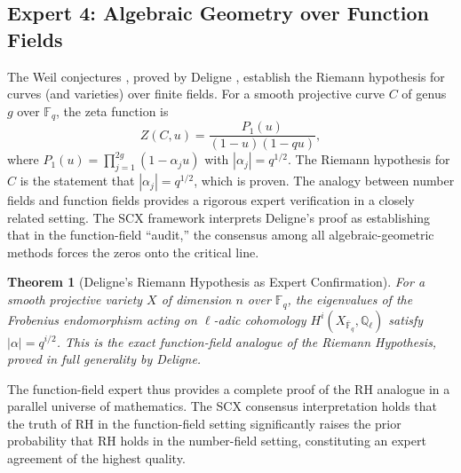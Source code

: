 \documentclass[12pt,a4paper]{article}
\newtheorem{theorem}{Theorem}[section]
\theoremstyle{remark}
\begin{document}
\subsection{Expert 4: Algebraic Geometry over Function Fields}
\label{sec:expert4}
The Weil conjectures \cite{Weil1948}, proved by Deligne \cite{Deligne1974},
establish the Riemann hypothesis for curves (and varieties) over finite
fields. For a smooth projective curve $C$ of genus $g$ over $\mathbb{F}_q$,
the zeta function is
\[
Z(C, u) = \frac{P_1(u)}{(1-u)(1-qu)},
\]
where $P_1(u) = \prod_{j=1}^{2g} (1 - \alpha_j u)$ with $|\alpha_j| = q^{1/2}$.
The Riemann hypothesis for $C$ is the statement that $|\alpha_j| = q^{1/2}$,
which is proven.
The analogy between number fields and function fields provides a rigorous
expert verification in a closely related setting. The SCX framework
interprets Deligne's proof as establishing that in the function-field
``audit,'' the consensus among all algebraic-geometric methods forces the
zeros onto the critical line.
\begin{theorem}[Deligne's Riemann Hypothesis as Expert Confirmation]
\label{thm:deligne}
For a smooth projective variety $X$ of dimension $n$ over $\mathbb{F}_q$,
the eigenvalues of the Frobenius endomorphism acting on $\ell$-adic
cohomology $H^{i}(X_{\overline{\mathbb{F}}_q}, \mathbb{Q}_{\ell})$
satisfy $|\alpha| = q^{i/2}$. This is the exact function-field analogue
of the Riemann Hypothesis, proved in full generality by Deligne.
\end{theorem}
The function-field expert thus provides a complete proof of the RH analogue
in a parallel universe of mathematics. The SCX consensus interpretation
holds that the truth of RH in the function-field setting significantly
raises the prior probability that RH holds in the number-field setting,
constituting an expert agreement of the highest quality.
\end{document}
